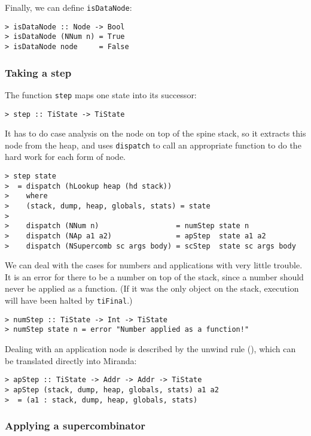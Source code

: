 Finally, we can define \mbox{\tt isDataNode}:
\begin{verbatim}
> isDataNode :: Node -> Bool
> isDataNode (NNum n) = True
> isDataNode node     = False
\end{verbatim}
%
%
%
\subsubsection{Taking a step}

The function \mbox{\tt step} maps one state into its successor:
\begin{verbatim}
> step :: TiState -> TiState
\end{verbatim}
%
It has to do case analysis on the node on top
of the spine stack, so it extracts
this node from the heap,
and uses \mbox{\tt dispatch} to call an appropriate function to
do the hard work for each form of node.
\begin{verbatim}
> step state
>  = dispatch (hLookup heap (hd stack))
>    where
>    (stack, dump, heap, globals, stats) = state
>
>    dispatch (NNum n)                  = numStep state n
>    dispatch (NAp a1 a2)               = apStep  state a1 a2
>    dispatch (NSupercomb sc args body) = scStep  state sc args body
\end{verbatim}
%
\par
We can deal with the cases for numbers and applications with very little
trouble.
It is an error for there to be a number
on top of the stack, since
a number should never be applied as a function.
(If it was the only object on the stack, execution will have been halted
by \mbox{\tt tiFinal}.)
\begin{verbatim}
> numStep :: TiState -> Int -> TiState
> numStep state n = error "Number applied as a function!"
\end{verbatim}
%
%
Dealing with an application node is described by the unwind
rule
(),
which can be translated directly into Miranda:
\begin{verbatim}
> apStep :: TiState -> Addr -> Addr -> TiState
> apStep (stack, dump, heap, globals, stats) a1 a2
>  = (a1 : stack, dump, heap, globals, stats)
\end{verbatim}
%
%

\subsubsection{Applying a supercombinator}
\label{instantiate}

